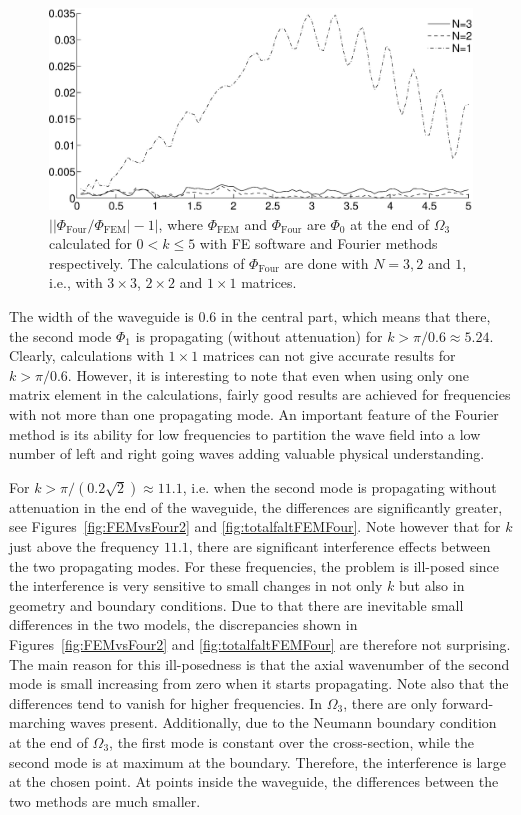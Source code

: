 \documentclass{svjour3}
\providecommand{\abs}[1]{\left\lvert#1\right\rvert}
\renewcommand{\Phi}{\varPhi}
\renewcommand{\Phi}{\varPhi}
\begin{document}
\begin{figure}[b]
  \centering
  \includegraphics[width=0.9\linewidth]{relerr123}
  \caption{$\abs{\abs{\Phi_{\text{Four}}/\Phi_{\text{FEM}}}-1}$, where
    $\Phi_{\text{FEM}}$ and $\Phi_{\text{Four}}$ are $\Phi_0$ at the
    end of $\Omega_3$ calculated for $0<k\le5$ with FE software and
    Fourier methods respectively. The calculations of
    $\Phi_{\text{Four}}$ are done with $N=3,2$ and $1$, i.e., with
    $3\times3$, $2\times2$ and $1\times1$ matrices.}
  \label{fig:relerr123}
\end{figure}

The width of the waveguide is $0.6$ in the central part, which means
that there, the second mode $\Phi_1$ is propagating (without
attenuation) for $k>\pi/0.6\approx5.24$. Clearly, calculations with
$1\times1$ matrices can not give accurate results for $k>\pi/0.6$.
However, it is interesting to note that even when using only one
matrix element in the calculations, fairly good results are achieved
for frequencies with not more than one propagating mode. An important
feature of the Fourier method is its ability for low frequencies to
partition the wave field into a low number of left and right going
waves adding valuable physical understanding.

For $k>\pi/(0.2\sqrt2)\approx11.1$, i.e. when the second mode is
propagating without attenuation in the end of the waveguide, the
differences are significantly greater, see
Figures~\ref{fig:FEMvsFour2} and \ref{fig:totalfaltFEMFour}. Note
however that for $k$ just above the frequency $11.1$, there are
significant interference effects between the two propagating
modes. For these frequencies, the problem is ill-posed since the
interference is very sensitive to small changes in not only $k$ but
also in geometry and boundary conditions. Due to that there are
inevitable small differences in the two models, the discrepancies
shown in Figures~\ref{fig:FEMvsFour2} and \ref{fig:totalfaltFEMFour}
are therefore not surprising. The main reason for this ill-posedness
is that the axial wavenumber of the second mode is small increasing
from zero when it starts propagating. Note also that the differences
tend to vanish for higher frequencies.  In $\Omega_3$, there are only
forward-marching waves present. Additionally, due to the Neumann
boundary condition at the end of $\Omega_3$, the first mode is
constant over the cross-section, while the second mode is at maximum
at the boundary. Therefore, the interference is large at the chosen
point. At points inside the waveguide, the differences between the two
methods are much smaller.
\end{document}
